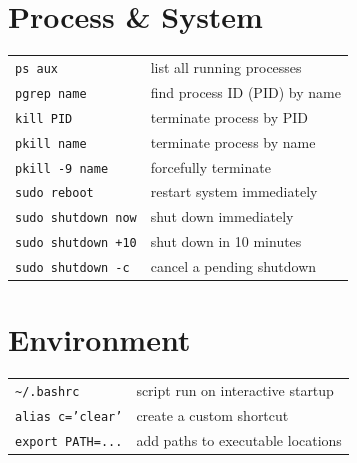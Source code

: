 \documentclass[a4paper, twocolumn]{article}
\renewcommand{\tt}{\texttt}
\begin{document}
\section{Process \& System}
\begin{tabular}{ll}
    \tt{ps aux}             & list all running processes            \\
    \tt{pgrep name}         & find process ID (PID) by name         \\
    \tt{kill PID}           & terminate process by PID              \\
    \tt{pkill name}         & terminate process by name             \\
    \tt{pkill -9 name}      & forcefully terminate                  \\
    \tt{sudo reboot}        & restart system immediately            \\
    \tt{sudo shutdown now}  & shut down immediately                 \\
    \tt{sudo shutdown +10}  & shut down in 10 minutes               \\
    \tt{sudo shutdown -c}   & cancel a pending shutdown             
\end{tabular}

\section{Environment}
\begin{tabular}{ll}
    \verb|~/.bashrc|        & script run on interactive startup     \\
    \tt{alias c='clear'}    & create a custom shortcut              \\
    \verb|export PATH=...|  & add paths to executable locations
\end{tabular}
\end{document}
